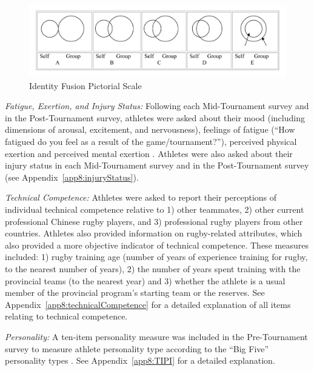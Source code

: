 \begin{CJK}{UTF8}{gbsn}



\begin{figure}[htbp]
  \includegraphics[width=\linewidth]{images/Identity_Fusion_Pictorial_Scale.png}
  \caption{Identity Fusion Pictorial Scale}
  \label{fig:fusionPictorialGroup}
\end{figure}




\textit{Fatigue, Exertion, and Injury Status:} Following each Mid-Tournament survey and in the Post-Tournament survey, athletes were asked about their mood (including dimensions of arousal, excitement, and nervousness), feelings of fatigue (``How fatigued do you feel as a result of the game/tournament?''), perceived physical exertion \citep[Borg RPE scale;][]{Borg1990} and perceived mental exertion \citep[see][]{Noakes2012a}. Athletes were also asked about their injury status in each Mid-Tournament survey and in the Post-Tournament survey (see Appendix~\ref{app8:injuryStatus}).

\textit{Technical Competence:} Athletes were asked to report their perceptions of individual technical competence relative to 1) other teammates, 2) other current professional Chinese rugby players, and  3) professional rugby players from other countries.  Athletes also provided information on rugby-related attributes, which also provided a more objective indicator of technical competence.  These measures included: 1) rugby training age (number of years of experience training for rugby, to the nearest number of years), 2) the number of years spent training with the provincial teams (to the nearest year) and 3) whether the athlete is a usual member of the provincial program's starting team or the reserves.  See Appendix~\ref{app8:technicalCompetence} for a detailed explanation of all items relating to technical competence.

\textit{Personality:} A ten-item personality measure was included in the Pre-Tournament survey to measure athlete personality type according to the ``Big Five'' personality types \citep[Ten Item Personality Index - TIPI.  The five types are: Extraversion, Agreeableness, Conscientiousness, Emotional Stability (Neuroticism reverse coded), and Openness to Experiences; see][]{Gosling2003}. See Appendix~\ref{app8:TIPI} for a detailed explanation.


\end{CJK}
